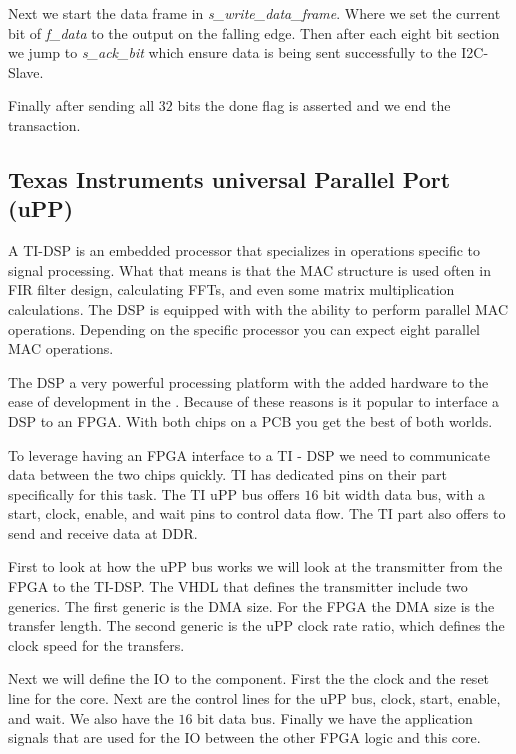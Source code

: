 Next we start the data frame in \emph{s\_write\_data\_frame}. Where we set the current bit of \emph{f\_data} to the output on the falling edge. Then after each eight bit section we jump to \emph{s\_ack\_bit} which ensure data is being sent successfully to the \ac{I2C}-Slave.

Finally after sending all $32$ bits the done flag is asserted and we end the transaction. 
	
	
\subsection{Texas Instruments universal Parallel Port (uPP)}
	
A \ac{TI}-\ac{DSP} is an embedded processor that specializes in operations specific to signal processing. What that means is that the \ac{MAC} structure is used often in \ac{FIR} filter design, calculating \ac{FFT}s, and even some matrix multiplication calculations. The \ac{DSP} is equipped with with the ability to perform parallel \ac{MAC} operations. Depending on the specific processor you can expect eight parallel \ac{MAC} operations. 

The \ac{DSP} a very powerful processing platform with the added hardware to the ease of development in the . Because of these reasons is it popular to interface a \ac{DSP} to an \ac{FPGA}. With both chips on a \ac{PCB} you get the best of both worlds. 

To leverage having an \ac{FPGA} interface to a \ac{TI} - \ac{DSP} we need to communicate data between the two chips quickly. \ac{TI} has dedicated pins on their part specifically for this task. The \ac{TI} \ac{uPP} bus offers $16$ bit width data bus, with a start, clock, enable, and wait pins to control data flow. The \ac{TI} part also offers to send and receive data at \ac{DDR}. 

First to look at how the \ac{uPP} bus works we will look at the transmitter from the \ac{FPGA} to the \ac{TI}-\ac{DSP}. The \ac{VHDL} that defines the transmitter include two generics. The first generic is the \ac{DMA} size. For the \ac{FPGA} the \ac{DMA} size is the transfer length. The second generic is the \ac{uPP} clock rate ratio, which defines the clock speed for the transfers. 

Next we will define the \ac{IO} to the component. First the the clock and the reset line for the core. Next are the control lines for the \ac{uPP} bus, clock, start, enable, and wait. We also have the $16$ bit data bus. Finally we have the application signals that are used for the \ac{IO} between the other \ac{FPGA} logic and this core. 

